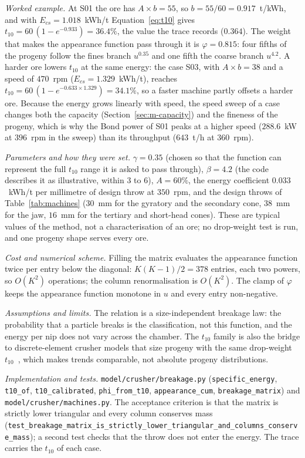 \emph{Worked example.} At S01 the ore has $A\times b=55$, so $b=55/60=0.917$~t/kWh, and with $E_{cs}=1.018$~kWh/t
Equation~\eqref{eq:t10} gives $t_{10}=60\,(1-e^{-0.933})=36.4\%$, the value the trace records ($0.364$). The weight that makes the
appearance function pass through it is $\varphi=0.815$: four fifths of the progeny follow the fines branch $u^{0.35}$ and one fifth the
coarse branch $u^{4.2}$. A harder ore lowers $t_{10}$ at the same energy: the case S03, with $A\times b=38$ and a speed of $470$~rpm
($E_{cs}=1.329$~kWh/t), reaches $t_{10}=60\,(1-e^{-0.633\times1.329})=34.1\%$, so a faster machine partly offsets a harder ore. Because the
energy grows linearly with speed, the speed sweep of a case changes both the capacity (Section~\ref{sec:m-capacity}) and the fineness of the
progeny, which is why the Bond power of S01 peaks at a higher speed ($288.6$~kW at $396$~rpm in the sweep) than its throughput ($643$~t/h at $360$~rpm).

\emph{Parameters and how they were set.} $\gamma=0.35$ (chosen so that the function can represent the full $t_{10}$ range it is asked
to pass through), $\beta=4.2$ (the code describes it as illustrative, within $3$ to $6$), $A=60\%$, the energy coefficient
$0.033$~kWh/t per millimetre of design throw at $350$~rpm, and the design throws of Table~\ref{tab:machines} ($30$~mm for the gyratory
and the secondary cone, $38$~mm for the jaw, $16$~mm for the tertiary and short-head cones). These are typical values of the method,
not a characterisation of an ore; no drop-weight test is run, and one progeny shape serves every ore.

\emph{Cost and numerical scheme.} Filling the matrix evaluates the appearance function twice per entry below the diagonal:
$K(K-1)/2=378$ entries, each two powers, so $O(K^2)$ operations; the column renormalisation is $O(K^2)$. The clamp of $\varphi$ keeps
the appearance function monotone in $u$ and every entry non-negative.

\emph{Assumptions and limits.} The relation is a size-independent breakage law: the probability that a particle breaks is the
classification, not this function, and the energy per nip does not vary across the chamber. The $t_{10}$ family is also the bridge
to discrete-element crusher models that size progeny with the same drop-weight $t_{10}$~\cite{delaney2015}, which makes trends
comparable, not absolute progeny distributions.

\emph{Implementation and tests.} \texttt{model/\allowbreak{}crusher/\allowbreak{}breakage.py} (\texttt{specific\_energy}, \texttt{t10\_of},
\texttt{t10\_calibrated}, \texttt{phi\_from\_t10}, \texttt{appearance\_cum}, \texttt{breakage\_matrix}) and
\texttt{model/\allowbreak{}crusher/\allowbreak{}machines.py}. The acceptance criterion is that the matrix is strictly lower triangular and every column
conserves mass (\texttt{test\_breakage\_matrix\_is\_strictly\_lower\_triangular\_and\_columns\_conserve\_mass}); a second test checks
that the throw does not enter the energy. The trace carries the $t_{10}$ of each case.

